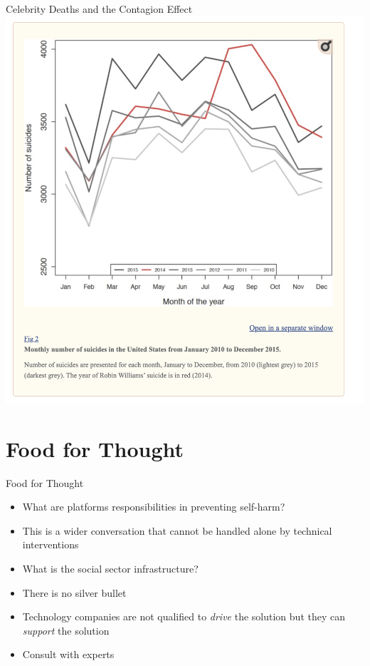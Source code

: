 \documentclass[nobackground,dvipsnames,table,aspectratio=169]{beamer}
\begin{document}
\begin{frame}{Celebrity Deaths and the Contagion Effect}
    \centering
    \includegraphics[height=0.88\textheight]{celebrity-deaths-contagion-effect}
\end{frame}

\section{Food for Thought}

\begin{frame}{Food for Thought}
    \begin{itemize}
        \item What are platforms responsibilities in preventing self-harm?
        \item This is a wider conversation that cannot be handled alone by technical interventions
        \item What is the social sector infrastructure?
        \item There is no silver bullet
        \item Technology companies are not qualified to \textit{drive} the solution but they can \textit{support} the solution
        \item Consult with experts
    \end{itemize}
\end{frame}
\end{document}
